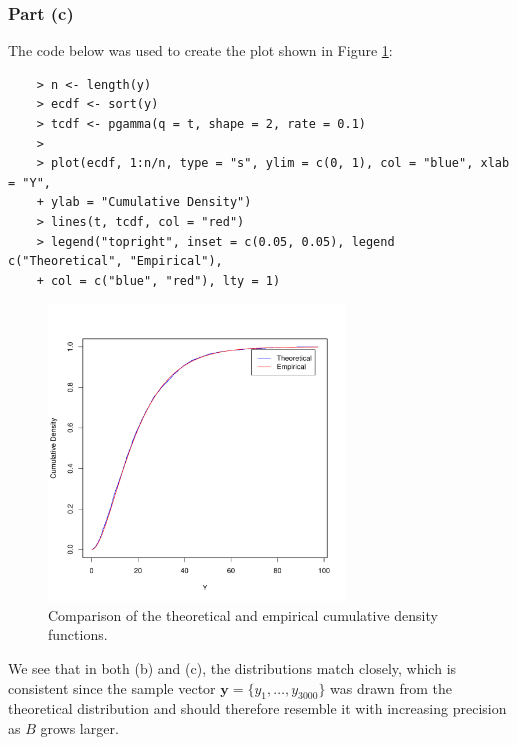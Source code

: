 \documentclass{report}
\begin{document}
\subsubsection*{Part (c)}
The code below was used to create the plot shown in Figure \ref{fig:comparison_ecdf_tcdf}:
\begin{verbatim}
    > n <- length(y)
    > ecdf <- sort(y)
    > tcdf <- pgamma(q = t, shape = 2, rate = 0.1)
    >
    > plot(ecdf, 1:n/n, type = "s", ylim = c(0, 1), col = "blue", xlab = "Y", 
    + ylab = "Cumulative Density")
    > lines(t, tcdf, col = "red")
    > legend("topright", inset = c(0.05, 0.05), legend c("Theoretical", "Empirical"), 
    + col = c("blue", "red"), lty = 1)
\end{verbatim}
\begin{figure}[H]
    \centering
    \includegraphics[width=0.7\textwidth]{comparison_ecdf_tcdf.pdf}
    \caption{Comparison of the theoretical and empirical cumulative density functions.}
    \label{fig:comparison_ecdf_tcdf}
\end{figure}

We see that in both (b) and (c), the distributions match closely, which is consistent since the sample vector $\mathbf{y} = \{y_1, \ldots, y_{3000}\}$ was drawn from the theoretical distribution and should therefore resemble it with increasing precision as $B$ grows larger.
\end{document}
